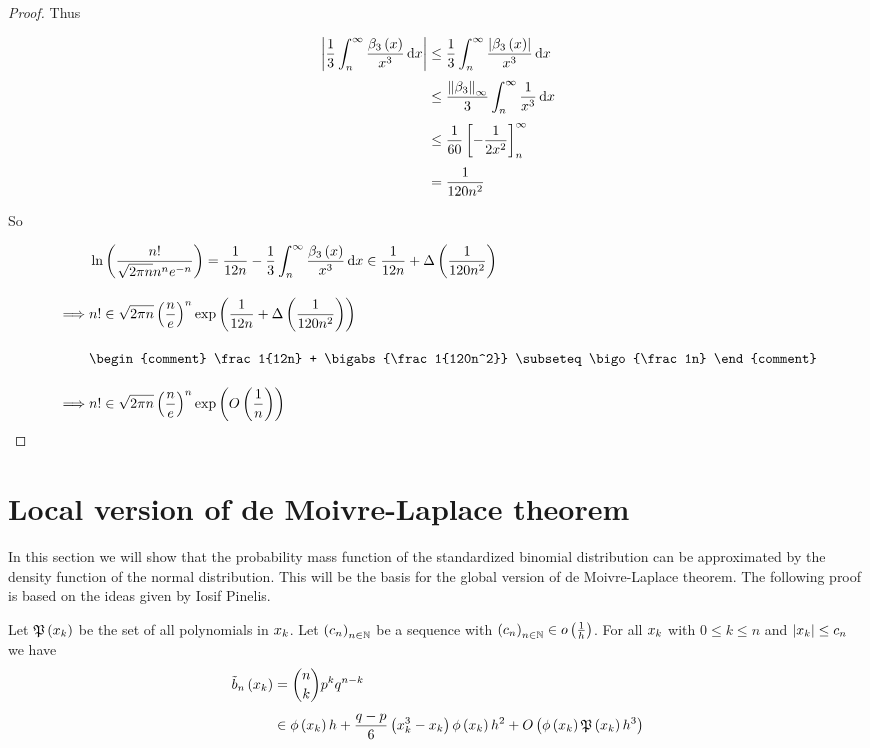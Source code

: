 \begin{proof}
  \noindent Thus

  \begin{align}
    \abs{\frac 13\int_n^\infty \frac{\bp[3]{x}}{x^3} \d{x}} & \le \frac 13 \int_n^\infty \frac{\abs{\bp[3]{x}}}{x^3} \d{x} \nl
    & \le \frac{\snorm{\bps[3]}}{3} \int_n^\infty \frac 1{x^3} \d{x} \nl
    & \le \frac{1}{60} \left[-\frac{1}{2x^2}\right]_n^\infty \nl
    & = \frac 1{120n^2}
  \end{align}

  \noindent So

  \begin{align}
    & \ln\left(\frac{n!}{\sqrt{2\pi n}n^n e^{-n}}\right) = \frac 1{12n} - \frac 13 \int_n^\infty \frac{\bp[3]{x}}{x^3} \d{x} \in \frac 1{12n} + \bigabs{\frac{1}{120n^2}} \bnl
    \implies & n! \in \sqrt{2\pi n} \left(\frac ne\right)^n \fexp{\frac 1{12n} + \bigabs{\frac 1{120n^2}}} \bnl
    &
    \begin{comment}
      \frac 1{12n} + \bigabs{\frac 1{120n^2}} \subseteq \bigo{\frac 1n}
    \end{comment} \bnl
    \implies & n! \in \sqrt{2\pi n} \left(\frac ne\right)^n \fexp{\bigo{\frac 1n}}
  \end{align}
\end{proof}

\section{Local version of de Moivre-Laplace theorem}

In this section we will show that the probability mass function of the standardized binomial distribution can be approximated by the density function of the normal distribution. This will be the basis for the global version of de Moivre-Laplace theorem. The following proof is based on the ideas given by Iosif Pinelis\cite{iosif}.

\begin{theorem}
  Let $\mathfrak P\left( {x_{k}} \right)$ be the set of all polynomials in $x_{k}$. Let $\left({c_n}\right)_{{n}\in\mathbb N}$ be a sequence with $\left({c_n}\right)_{{n}\in\mathbb N} \in o\left( {\frac 1h} \right)$. For all $x_{k}$ with $0\le k\le n$ and $\left|{x_k}\right| \le c_n$ we have
  \begin{align}
    \bb{x_k} &= \binom nk p^k q^{n-k} \nl
    &\in \fphi{\x} h +\frac{q-p}6 \left(\x^3-\x\right) \fphi{\x} h^2 + \bigo{\fphi{\x}\pol{\x}h^3}
  \end{align}
\end{theorem}

